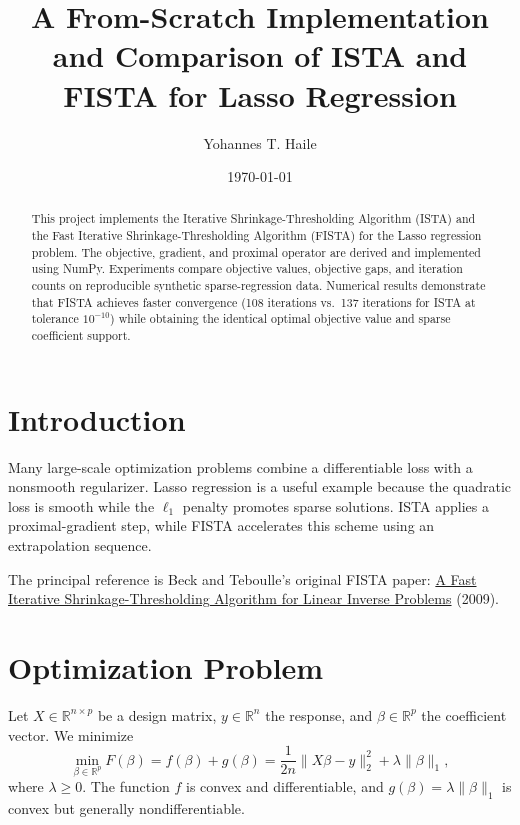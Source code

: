 \documentclass[11pt]{article}
\title{A From-Scratch Implementation and Comparison of ISTA and FISTA for Lasso Regression}
\author{Yohannes T. Haile}
\date{\today}
\begin{document}
\maketitle

\begin{abstract}
This project implements the Iterative Shrinkage-Thresholding Algorithm (ISTA)
and the Fast Iterative Shrinkage-Thresholding Algorithm (FISTA) for the Lasso
regression problem. The objective, gradient, and proximal operator are derived
and implemented using NumPy. Experiments compare objective values, objective
gaps, and iteration counts on reproducible synthetic sparse-regression data.
Numerical results demonstrate that FISTA achieves faster convergence (108 iterations vs.\ 137 iterations for ISTA at tolerance $10^{-10}$) while obtaining the identical optimal objective value and sparse coefficient support.
\end{abstract}

\section{Introduction}
Many large-scale optimization problems combine a differentiable loss with a
nonsmooth regularizer. Lasso regression is a useful example because the
quadratic loss is smooth while the $\ell_1$ penalty promotes sparse solutions.
ISTA applies a proximal-gradient step, while FISTA accelerates this scheme
using an extrapolation sequence.

The principal reference is Beck and Teboulle's original FISTA paper:
\href{https://doi.org/10.1137/080716542}{A Fast Iterative Shrinkage-Thresholding
Algorithm for Linear Inverse Problems} (2009).

\section{Optimization Problem}
Let $X\in\mathbb{R}^{n\times p}$ be a design matrix, $y\in\mathbb{R}^n$ the
response, and $\beta\in\mathbb{R}^p$ the coefficient vector. We minimize
\begin{equation}
  \min_{\beta\in\mathbb{R}^p} F(\beta)
  = f(\beta)+g(\beta)
  = \frac{1}{2n}\|X\beta-y\|_2^2+\lambda\|\beta\|_1,
  \label{eq:lasso}
\end{equation}
where $\lambda\geq 0$. The function $f$ is convex and differentiable, and
$g(\beta)=\lambda\|\beta\|_1$ is convex but generally nondifferentiable.
\end{document}
